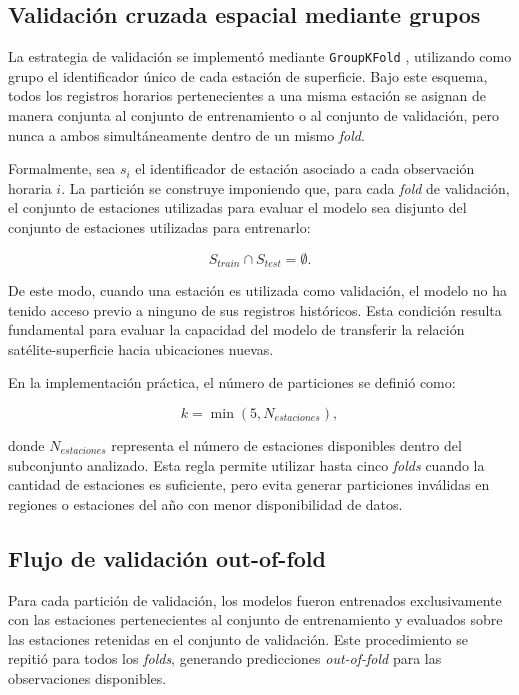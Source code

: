 \documentclass[../main.tex]{subfiles}
\begin{document}
\subsection{Validación cruzada espacial mediante grupos}

La estrategia de validación se implementó mediante \texttt{GroupKFold} \cite{scikit-learn}, utilizando como grupo el identificador único de cada estación de superficie. Bajo este esquema, todos los registros horarios pertenecientes a una misma estación se asignan de manera conjunta al conjunto de entrenamiento o al conjunto de validación, pero nunca a ambos simultáneamente dentro de un mismo \textit{fold}.

Formalmente, sea $s_i$ el identificador de estación asociado a cada observación horaria $i$. La partición se construye imponiendo que, para cada \textit{fold} de validación, el conjunto de estaciones utilizadas para evaluar el modelo sea disjunto del conjunto de estaciones utilizadas para entrenarlo:

\begin{equation}
S_{train} \cap S_{test} = \emptyset.
\end{equation}

De este modo, cuando una estación es utilizada como validación, el modelo no ha tenido acceso previo a ninguno de sus registros históricos. Esta condición resulta fundamental para evaluar la capacidad del modelo de transferir la relación satélite-superficie hacia ubicaciones nuevas.

En la implementación práctica, el número de particiones se definió como:

\begin{equation}
k = \min(5, N_{estaciones}),
\end{equation}

donde $N_{estaciones}$ representa el número de estaciones disponibles dentro del subconjunto analizado. Esta regla permite utilizar hasta cinco \textit{folds} cuando la cantidad de estaciones es suficiente, pero evita generar particiones inválidas en regiones o estaciones del año con menor disponibilidad de datos.

\subsection{Flujo de validación out-of-fold}

Para cada partición de validación, los modelos fueron entrenados exclusivamente con las estaciones pertenecientes al conjunto de entrenamiento y evaluados sobre las estaciones retenidas en el conjunto de validación. Este procedimiento se repitió para todos los \textit{folds}, generando predicciones \textit{out-of-fold} para las observaciones disponibles.
\end{document}
